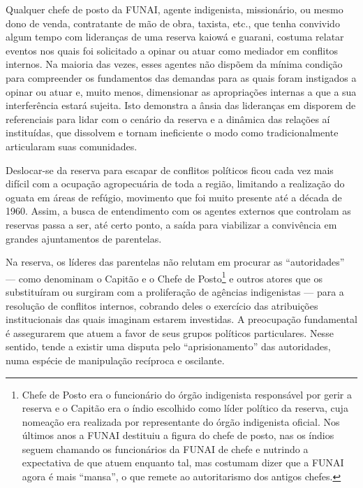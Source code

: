 Qualquer chefe de posto da FUNAI, agente indigenista, missionário, ou
mesmo dono de venda, contratante de mão de obra, taxista, etc., que
tenha convivido algum tempo com lideranças de uma reserva kaiowá e
guarani, costuma relatar eventos nos quais foi solicitado a opinar ou
atuar como mediador em conflitos internos. Na maioria das vezes, esses
agentes não dispõem da mínima condição para compreender os fundamentos
das demandas para as quais foram instigados a opinar ou atuar e, muito
menos, dimensionar as apropriações internas a que a sua interferência
estará sujeita. Isto demonstra a ânsia das lideranças em disporem de
referenciais para lidar com o cenário da reserva e a dinâmica das
relações aí instituídas, que dissolvem e tornam ineficiente o modo como
tradicionalmente articularam suas comunidades. 

Deslocar-se da reserva para escapar de conflitos políticos ficou cada
vez mais difícil com a ocupação agropecuária de toda a região,
limitando a realização do oguata em áreas de refúgio, movimento que foi
muito presente até a década de 1960. Assim, a busca de entendimento com
os agentes externos que controlam as reservas passa a ser, até certo
ponto, a saída para viabilizar a convivência em grandes ajuntamentos de
parentelas. 

Na reserva, os líderes das parentelas não relutam em procurar as
``autoridades'' — como denominam o Capitão e o Chefe de
Posto\footnote{Chefe de Posto era o funcionário do órgão indigenista
responsável por gerir a reserva e o Capitão era o índio escolhido como
líder político da reserva, cuja nomeação era realizada por
representante do órgão indigenista oficial. Nos últimos anos a FUNAI
destituiu a figura do chefe de posto, nas os índios seguem chamando os
funcionários da FUNAI de chefe e nutrindo a expectativa de que atuem
enquanto tal, mas costumam dizer que a FUNAI agora é mais ``mansa'', o
que remete ao autoritarismo dos antigos chefes.} e outros atores que os
substituíram ou surgiram com a proliferação de agências indigenistas —
para a resolução de conflitos internos, cobrando deles o exercício das
atribuições institucionais das quais imaginam estarem investidas. A
preocupação fundamental é assegurarem que atuem a favor de seus grupos
políticos particulares. Nesse sentido, tende a existir uma disputa pelo
``aprisionamento'' das autoridades, numa espécie de manipulação recíproca
e oscilante.

